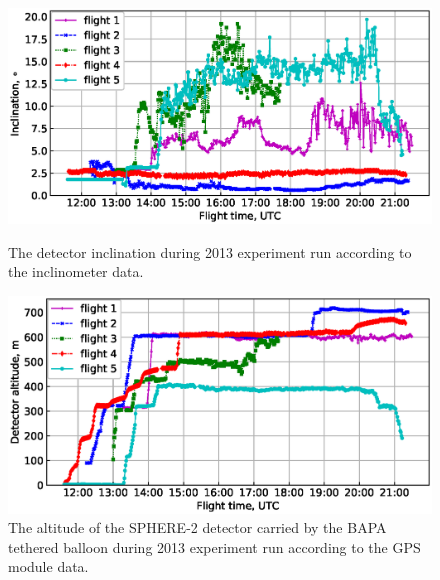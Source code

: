 \documentclass[final,5p,times,twocolumn]{elsarticle}
\begin{document}
\begin{figure}[tb]
    \begin{minipage}[t]{0.48\textwidth}
    \centering
    \includegraphics[width=\textwidth]{figs/ClinTh.eps}
    \caption{The detector inclination during 2013 experiment run according to the inclinometer data.}
    \label{fig:inclination} 
    \end{minipage}
    \hfill
    \begin{minipage}[t]{0.48\textwidth}
    \centering
    \includegraphics[width=\textwidth]{figs/height.eps}
    \caption{The altitude of the SPHERE-2 detector carried by the BAPA tethered balloon during 2013 experiment run according to the GPS module data.}
    \label{fig:height}
    \end{minipage}

  \vspace{1.5pc}


\end{figure}
\end{document}
